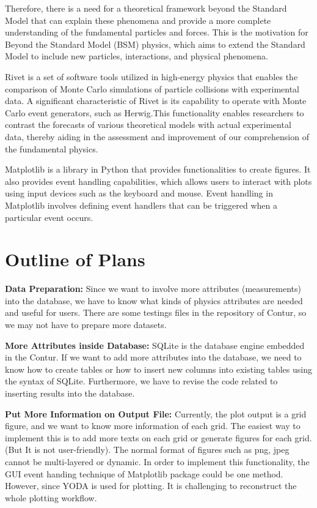 \documentclass[10pt]{article}
\begin{document}
	Therefore, there is a need for a theoretical framework beyond the Standard Model that can explain these phenomena and provide a more complete understanding of the fundamental particles and forces. This is the motivation for Beyond the Standard Model (BSM) physics, which aims to extend the Standard Model to include new particles, interactions, and physical phenomena.
	
	Rivet is a set of software tools utilized in high-energy physics that enables the comparison of Monte Carlo simulations of particle collisions with experimental data. A significant characteristic of Rivet is its capability to operate with Monte Carlo event generators, such as Herwig.This functionality enables researchers to contrast the forecasts of various theoretical models with actual experimental data, thereby aiding in the assessment and improvement of our comprehension of the fundamental physics.
	
	Matplotlib \cite{Hunter:2007} is a library in Python that provides functionalities to create figures. It also provides event handling capabilities, which allows users to interact with plots using input devices such as the keyboard and mouse. Event handling in Matplotlib involves defining event handlers that can be triggered when a particular event occurs.
	\section{Outline of Plans}
\textbf{Data Preparation:}
	Since we want to involve more attributes (measurements) into the database, we have to know what kinds of physics attributes are needed and useful for users. There are some testings files in the repository of Contur, so we may not have to prepare more datasets.

\textbf{More Attributes inside Database:}
	SQLite is the database engine embedded in the Contur.
	If we want to add more attributes into the database, we need to know how to create tables or how to insert new columns into existing tables using the syntax of SQLite. Furthermore, we have to revise the code related to inserting results into the database.
	
\textbf{Put More Information on Output File:}
	Currently, the plot output is a grid figure, and we want to know more information of each grid. The easiest way to implement this is to add more texts on each grid or generate figures for each grid. (But It is not user-friendly). The normal format of figures such as png, jpeg cannot be multi-layered or dynamic. In order to implement this functionality, the GUI event handing technique of Matplotlib package could be one method. However, since YODA is used for plotting. It is challenging to reconstruct the whole plotting workflow.
	


\end{document}
